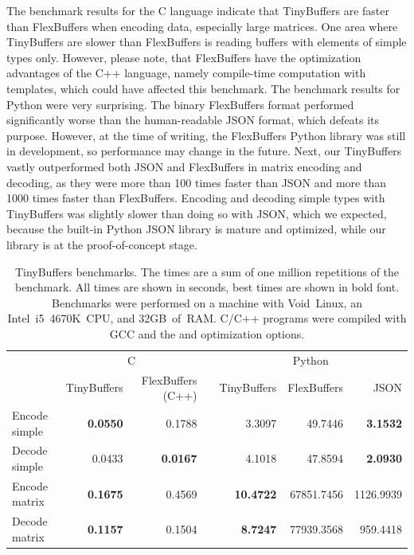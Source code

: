 The benchmark results for the C language indicate that TinyBuffers are faster than FlexBuffers when encoding data, especially large matrices. One area where TinyBuffers are slower than FlexBuffers is reading buffers with elements of simple types only. However, please note, that FlexBuffers have the optimization advantages of the C++ language, namely compile-time computation with templates, which could have affected this benchmark. The benchmark results for Python were very surprising. The binary FlexBuffers format performed significantly worse than the human-readable JSON format, which defeats its purpose. However, at the time of writing, the FlexBuffers Python library was still in development, so performance may change in the future. Next, our TinyBuffers vastly outperformed both JSON and FlexBuffers in matrix encoding and decoding, as they were more than 100 times faster than JSON and more than 1000 times faster than FlexBuffers. Encoding and decoding simple types with TinyBuffers was slightly slower than doing so with JSON, which we expected, because the built-in Python JSON library is mature and optimized, while our library is at the proof-of-concept stage.


\begin{table}[t]
\centering\footnotesize
\caption{TinyBuffers benchmarks. The times are a sum of one million repetitions of the benchmark. All times are shown in seconds, best times are shown in bold font. Benchmarks were performed on a machine with Void~Linux, an Intel~i5~4670K~CPU, and 32GB~of~RAM. C/C++ programs were compiled with GCC and the  and  optimization options.}
\label{tab:tb_bench}
\begin{tabular}{lrrcrrr}
\toprule
& \multicolumn{2}{c}{C} & \phantom{abc} & \multicolumn{3}{c}{Python} \\
\cmidrule{2-3} \cmidrule{5-7}
& TinyBuffers & FlexBuffers (C++) && TinyBuffers & FlexBuffers & JSON \\
\midrule
Encode simple & \textbf{0.0550} & 0.1788 && 3.3097 & 49.7446 & \textbf{3.1532} \\
Decode simple & 0.0433 & \textbf{0.0167} && 4.1018 & 47.8594 & \textbf{2.0930} \\
Encode matrix & \textbf{0.1675} & 0.4569 && \textbf{10.4722} & 67851.7456 & 1126.9939 \\
Decode matrix & \textbf{0.1157} & 0.1504 && \textbf{ 8.7247} & 77939.3568 &  959.4418 \\
\bottomrule
\end{tabular}
\end{table}


